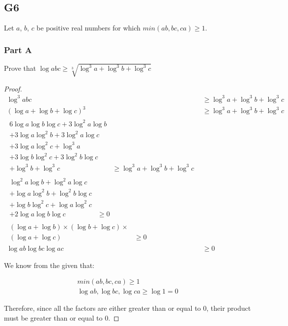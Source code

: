 \subsection*{G6}

Let $a$, $b$, $c$ be positive real numbers for which $min(ab, bc, ca) \geq 1$.

\subsubsection*{Part A}

Prove that $\log{abc} \geq \sqrt[3]{\log^3{a} + \log^3{b} + \log^3{c}}$

\begin{proof}
    \begin{align*}
        \log^3{abc} &\geq \log^3{a} + \log^3{b} + \log^3{c} \\ 
        (\log{a} + \log{b} + \log{c} )^3 &\geq \log^3{a} + \log^3{b} + \log^3{c} \\
        \begin{split}
            6\log{a}\log{b}\log{c} + 3\log^2{a}\log{b} \\
            + 3\log{a}\log^2{b} + 3\log^2{a}\log{c} \\
            + 3\log{a}\log^2{c} + \log^3{a} \\
            + 3\log{b}\log^2{c} + 3\log^2{b}\log{c} \\
            + \log^3{b} + \log^3{c} &\geq \log^3{a} + \log^3{b} + \log^3{c}
        \end{split} \\
        \begin{split} 
            \log^2{a}\log{b}+ \log^2{a}\log{c}  \\
            + \log{a}\log^2{b} + \log^2{b}\log{c} \\
            + \log{b}\log^2{c} + \log{a}\log^2{c}  \\
            + 2\log{a}\log{b}\log{c} &\geq 0
        \end{split} \\
        \begin{split}
            (\log{a} + \log{b}) \times (\log{b} + \log{c}) \times \\
            (\log{a} + \log{c}) &\geq 0
        \end{split} \\
        \log{ab}\log{bc}\log{ac} &\geq 0
    \end{align*}

We know from the given that:

\begin{gather*}
    min(ab, bc, ca) \geq 1 \\
    \log{ab}, \log{bc}, \log{ca} \geq \log{1} = 0
\end{gather*}

Therefore, since all the factors are either greater than or equal to 0, their product must be greater than or equal to 0.

\end{proof}

